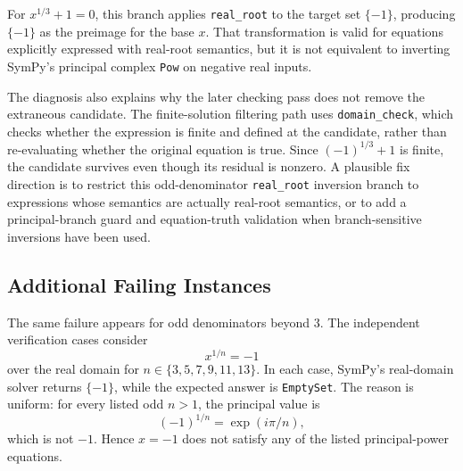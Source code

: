 \documentclass[11pt]{article}
\begin{document}
For \(x^{1/3}+1=0\), this branch applies \texttt{real\_root} to the target set
\(\{-1\}\), producing \(\{-1\}\) as the preimage for the base \(x\).  That
transformation is valid for equations explicitly expressed with real-root
semantics, but it is not equivalent to inverting SymPy's principal complex
\texttt{Pow} on negative real inputs.

The diagnosis also explains why the later checking pass does not remove the
extraneous candidate.  The finite-solution filtering path uses
\texttt{domain\_check}, which checks whether the expression is finite and
defined at the candidate, rather than re-evaluating whether the original
equation is true.  Since \((-1)^{1/3}+1\) is finite, the candidate survives even
though its residual is nonzero.  A plausible fix direction is to restrict this
odd-denominator \texttt{real\_root} inversion branch to expressions whose
semantics are actually real-root semantics, or to add a principal-branch guard
and equation-truth validation when branch-sensitive inversions have been used.

\subsection{Additional Failing Instances}

The same failure appears for odd denominators beyond \(3\).  The independent
verification cases consider
\[
x^{1/n}=-1
\]
over the real domain for \(n\in\{3,5,7,9,11,13\}\).  In each case, SymPy's
real-domain solver returns \(\{-1\}\), while the expected answer is
\texttt{EmptySet}.  The reason is uniform: for every listed odd \(n>1\), the
principal value is
\[
(-1)^{1/n}=\exp(i\pi/n),
\]
which is not \(-1\).  Hence \(x=-1\) does not satisfy any of the listed
principal-power equations.
\end{document}
